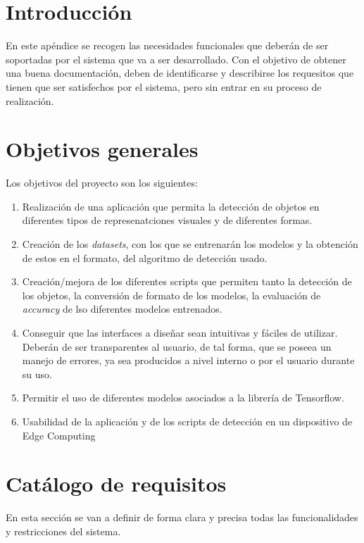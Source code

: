 
\section{Introducción}
En este apéndice se recogen las necesidades funcionales que deberán de ser soportadas por el sistema que va a ser desarrollado. Con el objetivo de obtener una buena documentación, deben de identificarse y describirse los requesitos que tienen que ser satisfechos por el sistema, pero sin entrar en su proceso de realización.

\section{Objetivos generales}
Los objetivos del proyecto son los siguientes:
\begin{enumerate}
    \item Realización de una aplicación que permita la detección de objetos en diferentes tipos de represenatciones visuales y de diferentes formas.
    \item Creación de los \textit{datasets}, con los que se entrenarán los modelos y la obtención de estos en el formato, del algoritmo de detección usado.
    \item Creación/mejora de los diferentes scripts que permiten tanto la detección de los objetos, la conversión de formato de los modelos, la evaluación de \textit{accuracy} de lso diferentes modelos entrenados. 
    \item Conseguir que las interfaces a diseñar sean intuitivas y fáciles de utilizar. Deberán de ser transparentes al usuario, de tal forma, que se poseea un manejo de errores, ya sea producidos a nivel interno o por el usuario durante su uso.
    \item Permitir el uso de diferentes modelos asociados a la librería de Tensorflow. 
    \item Usabilidad de la aplicación y de los scripts de detección en un dispositivo de Edge Computing  
\end{enumerate}

\section{Catálogo de requisitos}
En esta sección se van a definir de forma clara y precisa todas las funcionalidades y restricciones del sistema.

